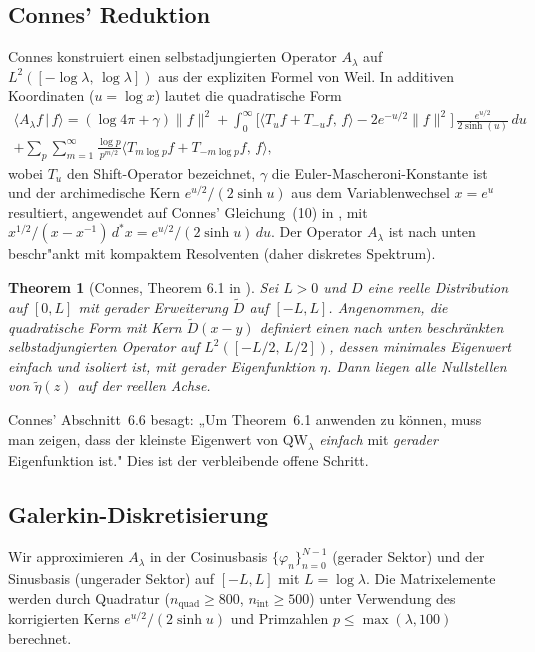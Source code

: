 \documentclass[12pt,a4paper]{article}
\newtheorem{theorem}{Theorem}[section]
\theoremstyle{definition}
\theoremstyle{remark}
\begin{document}
\subsection{Connes' Reduktion}

Connes konstruiert einen selbstadjungierten Operator $A_\lambda$ auf $L^2([-\log\lambda,\,\log\lambda])$ aus der expliziten Formel von Weil. In additiven Koordinaten ($u = \log x$) lautet die quadratische Form
\begin{multline*}
  \langle A_\lambda f \,|\, f \rangle = (\log 4\pi + \gamma)\|f\|^2
  + \int_0^\infty \Big[\langle T_u f + T_{-u} f,\, f \rangle - 2e^{-u/2}\|f\|^2\Big]\,\frac{e^{u/2}}{2\sinh(u)}\,du \\
  + \sum_p \sum_{m=1}^\infty \frac{\log p}{p^{m/2}} \langle T_{m\log p} f + T_{-m\log p} f,\, f \rangle,
\end{multline*}
wobei $T_u$ den Shift-Operator bezeichnet, $\gamma$ die Euler-Mascheroni-Konstante ist und der archimedische Kern $e^{u/2}/(2\sinh u)$ aus dem Variablenwechsel $x = e^u$ resultiert, angewendet auf Connes' Gleichung~(10) in \cite{Connes2026}, mit $x^{1/2}/(x-x^{-1})\,d^*\!x = e^{u/2}/(2\sinh u)\,du$. Der Operator $A_\lambda$ ist nach unten beschr"ankt mit kompaktem Resolventen (daher diskretes Spektrum).

\begin{theorem}[Connes, Theorem 6.1 in \cite{Connes2026}]
Sei $L > 0$ und $D$ eine reelle Distribution auf $[0,L]$ mit gerader Erweiterung $\tilde{D}$ auf $[-L,L]$. Angenommen, die quadratische Form mit Kern $\tilde{D}(x-y)$ definiert einen nach unten beschränkten selbstadjungierten Operator auf $L^2([-L/2,\,L/2])$, dessen minimales Eigenwert einfach und isoliert ist, mit gerader Eigenfunktion $\eta$. Dann liegen alle Nullstellen von $\tilde{\eta}(z)$ auf der reellen Achse.
\end{theorem}

\noindent Connes' Abschnitt~6.6 besagt: „Um Theorem~6.1 anwenden zu können, muss man zeigen, dass der kleinste Eigenwert von $\mathrm{QW}_\lambda$ \emph{einfach} mit \emph{gerader} Eigenfunktion ist." Dies ist der verbleibende offene Schritt.

\subsection{Galerkin-Diskretisierung}

Wir approximieren $A_\lambda$ in der Cosinusbasis $\{\varphi_n\}_{n=0}^{N-1}$ (gerader Sektor) und der Sinusbasis (ungerader Sektor) auf $[-L,L]$ mit $L = \log\lambda$. Die Matrixelemente werden durch Quadratur ($n_{\mathrm{quad}} \geq 800$, $n_{\mathrm{int}} \geq 500$) unter Verwendung des korrigierten Kerns $e^{u/2}/(2\sinh u)$ und Primzahlen $p \leq \max(\lambda, 100)$ berechnet.
\end{document}

